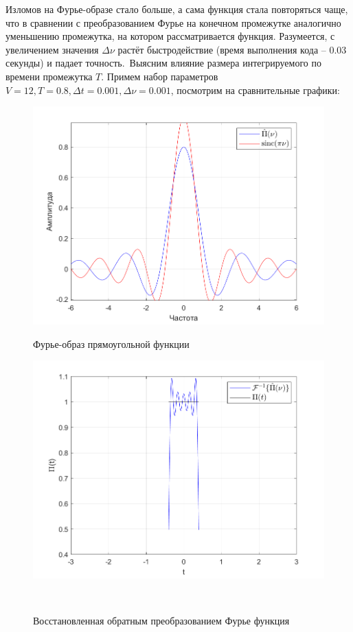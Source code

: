 \documentclass[a4paper]{article}
\begin{document}
Изломов на Фурье-образе стало больше, а сама функция стала повторяться чаще, что в сравнении с преобразованием Фурье на конечном промежутке аналогично уменьшению промежутка, на котором рассматривается функция. Разумеется, с увеличением значения $\Delta \nu$ растёт быстродействие (время выполнения кода -- 0.03 секунды) и падает точность.\ 
Выясним влияние размера интегрируемого по времени промежутка $T$. Примем набор параметров $V = 12, T = 0.8, \Delta t = 0.001, \Delta \nu=0.001$, посмотрим на сравнительные графики:

\begin{figure}[H]
    \begin{minipage}{0.5\textwidth}
        \centering \includegraphics[width=\textwidth]{graphs/1/T_0.8_dt_0.001_V_12_dv_0.001/fourier_numerical.png}
        \caption{Фурье-образ прямоугольной функции}
    \end{minipage}\hfill
    \begin{minipage}{0.5\textwidth}
        \centering \includegraphics[width=\textwidth]{graphs/1/T_0.8_dt_0.001_V_12_dv_0.001/func_inversed_fourier.png}
        \caption{Восстановленная обратным преобразованием Фурье функция}
    \end{minipage}\\[1em]
\end{figure}\noindent\
\end{document}
